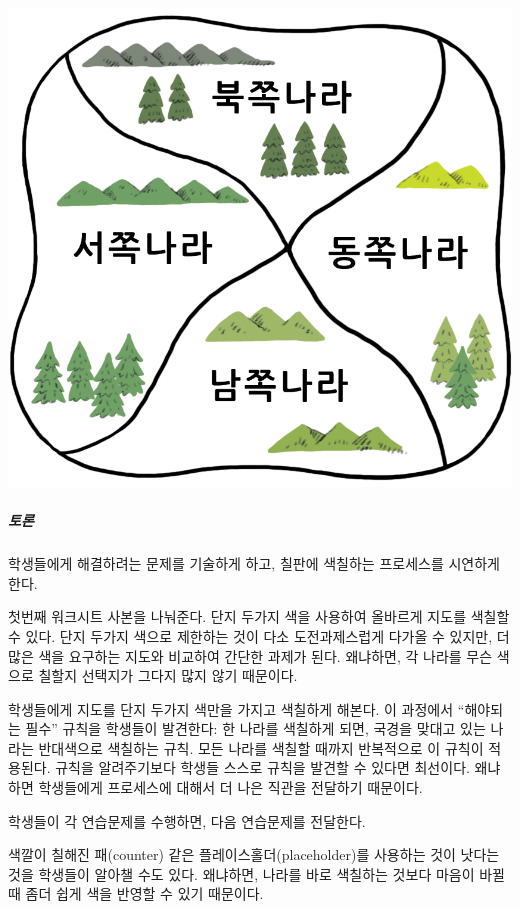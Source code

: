 \documentclass[]{article}
\begin{document}
\includegraphics{csunplugged/04-part/img/ch14-coloring/13-coloring-02-four-countries.png}

\subparagraph{토론}\label{section-189}

학생들에게 해결하려는 문제를 기술하게 하고, 칠판에 색칠하는 프로세스를
시연하게 한다.

첫번째 워크시트 사본을 나눠준다. 단지 두가지 색을 사용하여 올바르게
지도를 색칠할 수 있다. 단지 두가지 색으로 제한하는 것이 다소
도전과제스럽게 다가올 수 있지만, 더 많은 색을 요구하는 지도와 비교하여
간단한 과제가 된다. 왜냐하면, 각 나라를 무슨 색으로 칠할지 선택지가
그다지 많지 않기 때문이다.

학생들에게 지도를 단지 두가지 색만을 가지고 색칠하게 해본다. 이 과정에서
``해야되는 필수'' 규칙을 학생들이 발견한다: 한 나라를 색칠하게 되면,
국경을 맞대고 있는 나라는 반대색으로 색칠하는 규칙. 모든 나라를 색칠할
때까지 반복적으로 이 규칙이 적용된다. 규칙을 알려주기보다 학생들 스스로
규칙을 발견할 수 있다면 최선이다. 왜냐하면 학생들에게 프로세스에 대해서
더 나은 직관을 전달하기 때문이다.

학생들이 각 연습문제를 수행하면, 다음 연습문제를 전달한다.

색깔이 칠해진 패(counter) 같은 플레이스홀더(placeholder)를 사용하는 것이
낫다는 것을 학생들이 알아챌 수도 있다. 왜냐하면, 나라를 바로 색칠하는
것보다 마음이 바뀔 때 좀더 쉽게 색을 반영할 수 있기 때문이다.
\end{document}
